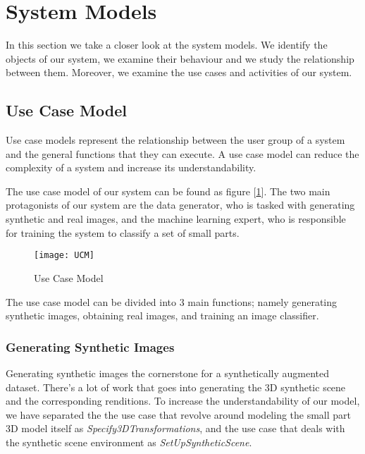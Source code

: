 \section{System Models}
In this section we take a closer look at the system models. We identify the objects of our system, we examine their behaviour and we study the relationship between them. Moreover, we examine the use cases and activities of our system.

\subsection{Use Case Model}

Use case models represent the relationship between the user group of a system and the general functions that they can execute. A use case model can reduce the complexity of a system and increase its understandability.

The use case model of our system can be found as figure [\ref{fig:UCM}]. The two main protagonists of our system are the data generator, who is tasked with generating synthetic and real images, and the machine learning expert, who is responsible for training the system to classify a set of small parts.

\begin{figure}[H]
\centering
  \texttt{[image: UCM]}
\caption{Use Case Model}
\label{fig:UCM}
\end{figure}

The use case model can be divided into 3 main functions; namely generating synthetic images, obtaining real images, and training an image classifier.

\subsubsection{Generating Synthetic Images}

Generating synthetic images the cornerstone for a synthetically augmented dataset. There's a lot of work that goes into generating the 3D synthetic scene and the corresponding renditions. To increase the understandability of our model, we have separated the the use case that revolve around modeling the small part 3D model itself as \textit{Specify3DTransformations}, and the use case that deals with the synthetic scene environment as \textit{SetUpSyntheticScene}.

